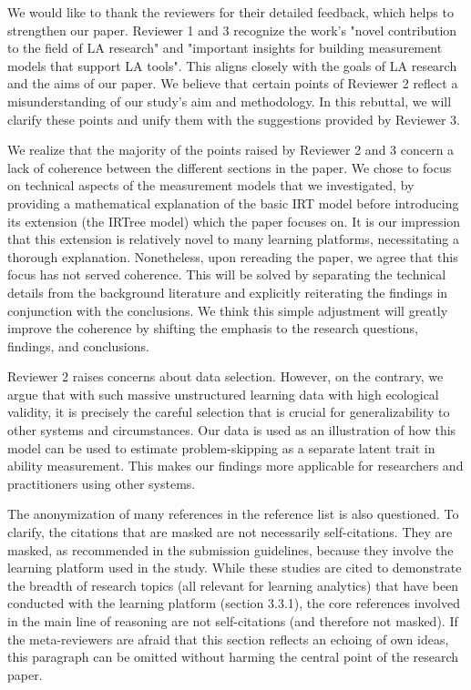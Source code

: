 \documentclass[]{article}
\begin{document}
We would like to thank the reviewers for their detailed feedback, which helps to strengthen our paper. Reviewer 1 and 3 recognize the work's "novel contribution to the field of LA research" and "important insights for building measurement models that support LA tools". This aligns closely with the goals of LA research and the aims of our paper. We believe that certain points of Reviewer 2 reflect a misunderstanding of our study's aim and methodology. In this rebuttal, we will clarify these points and unify them with the suggestions provided by Reviewer 3. 

We realize that the majority of the points raised by Reviewer 2 and 3 concern a lack of coherence between the different sections in the paper. We chose to focus on technical aspects of the measurement models that we investigated, by providing a mathematical explanation of the basic IRT model before introducing its extension (the IRTree model) which the paper focuses on. It is our impression that this extension is relatively novel to many learning platforms, necessitating a thorough explanation. Nonetheless, upon rereading the paper, we agree that this focus has not served coherence. This will be solved by separating the technical details from the background literature and explicitly reiterating the findings in conjunction with the conclusions. We think this simple adjustment will greatly improve the coherence by shifting the emphasis to the research questions, findings, and conclusions.

Reviewer 2 raises concerns about data selection. However, on the contrary, we argue that with such massive unstructured learning data with high ecological validity, it is precisely the careful selection that is crucial for generalizability to other systems and circumstances. Our data is used as an illustration of how this model can be used to estimate problem-skipping as a separate latent trait in ability measurement. This makes our findings more applicable for researchers and practitioners using other systems. 

The anonymization of many references in the reference list is also questioned. To clarify, the citations that are masked are not necessarily self-citations. They are masked, as recommended in the submission guidelines, because they involve the learning platform used in the study. While these studies are cited to demonstrate the breadth of research topics (all relevant for learning analytics) that have been conducted with the learning platform (section 3.3.1), the core references involved in the main line of reasoning are not self-citations (and therefore not masked). If the meta-reviewers are afraid that this section reflects an echoing of own ideas, this paragraph can be omitted without harming the central point of the research paper. 
\end{document}
